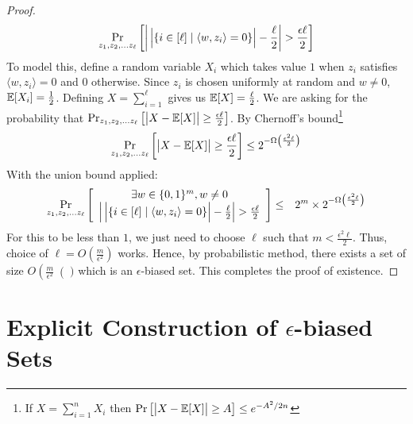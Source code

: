 \begin{proof}
$$\Pr_{z_1,z_2, \ldots z_\ell} \left[ 
\left| \vphantom{2^{2^{2^2}}} \card{\vphantom{2^{2^{2}}}\{i \in [\ell] \mid \langle w,z_i \rangle = 0\}} - \frac{\ell}{2} \right| > \frac{\epsilon\ell}{2}
\right]
$$
To model this, define a random variable $X_i$ which takes value $1$ when $z_i$ satisfies $\langle w,z_i \rangle = 0$ and $0$ otherwise. Since $z_i$ is chosen uniformly at random and $w \ne 0$, ${\mathbb E}[X_i] = \frac{1}{2}$. Defining $X = \sum_{i=1}^\ell$ gives us ${\mathbb E}[X] = \frac{\ell}{2}$. We are asking for the probability that $\Pr_{z_1,z_2, \ldots z_\ell} \left[ \card{\aphantom X - \E[X]} \ge \frac{\epsilon\ell}{2} \right]$. By Chernoff's bound\footnote{If $X = \sum_{i=1}^n{X_i}$ then $\Pr \left[ \card{\aphantom X - \E[X]} \ge A \right] \le e^{-A^2/2n}$}
$$\Pr_{z_1,z_2, \ldots z_\ell} \left[ \card{\aphantom X - \E[X]} \ge \frac{\epsilon\ell}{2} \right] \le 2^{-\Omega\left(\frac{\epsilon^2\ell}{2}\right)}$$
With the union bound applied:
\begin{eqnarray*}
\Pr_{z_1,z_2, \ldots z_\ell} \left[ 
\begin{array}{cc}
 \exists w \in \zo^m, w \ne 0 \\
\left| \vphantom{2^{2^{2^2}}} \card{\vphantom{2^{2^{2}}}\{i \in [\ell] \mid \langle w,z_i \rangle = 0\}} - \frac{\ell}{2} \right| > \frac{\epsilon\ell}{2}
\end{array}
\right]
& \le & 2^m \times 2^{-\Omega\left(\frac{\epsilon^2\ell}{2}\right)}
\end{eqnarray*}
For this to be less than $1$, we just need to choose $\ell$ such that $m < \frac{\epsilon^2\ell}{2}$. Thus, choice of $\ell = O\left(\frac{m}{\epsilon^2}\right)$ works. Hence, by probabilistic method, there exists a set of size $O\left(\frac{m}{\epsilon^2}\right()$ which is an $\epsilon$-biased set. This completes the proof of existence.
\end{proof}


\section{Explicit Construction of $\epsilon$-biased Sets}

